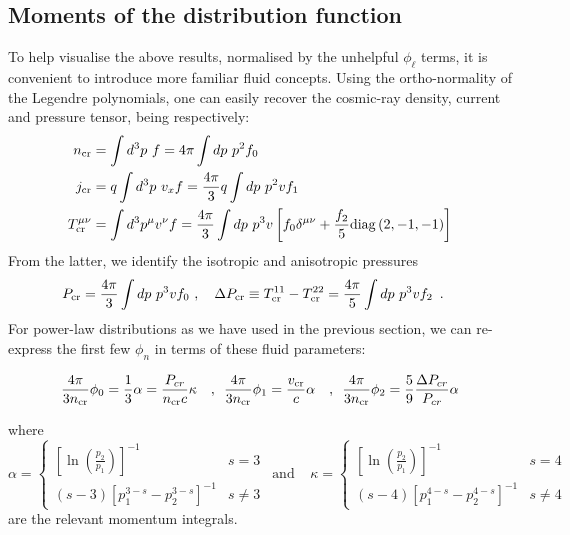 \documentclass[a4paper,fleqn,usenatbib]{mnras}
\begin{document}
\subsection{Moments of the distribution function}

To help visualise the above results, normalised by the unhelpful $\phi_\ell$ terms, it is convenient to introduce more familiar fluid concepts. Using the ortho-normality of the Legendre polynomials, one can easily recover the cosmic-ray density, current and pressure tensor, being respectively:
\begin{align*}
n_{\rm cr} &= \int d^3p~ f =  4 \pi\int dp~p^2 f_0 \\
j_{\rm cr} &= q\int d^3p~ v_x f  = \frac{4\pi}{3} q\int dp~p^2 v f_1 \\
T^{\mu\nu}_{\rm cr} &= \int d^3p^\mu v^{\nu} f =   \frac{4\pi}{3} \int dp~p^3 v \left[f_0\delta^{\mu\nu} 
+ \frac{f_2}{5}{\rm diag}\left(2 ,-1,-1 \right)\right]  
\end{align*}
From the latter, we identify the isotropic and anisotropic pressures
\begin{align*}
&P_{\rm cr} =   \frac{4\pi}{3} \int dp~p^3 v f_0 ~, \enspace \enspace
\Delta P_{\rm cr}\equiv T_{\rm cr}^{11}-T_{\rm cr}^{22} =   \frac{4\pi}{5} \int dp~p^3 v f_2 \enspace .
\end{align*}
For power-law distributions as we have used in the previous section, we can re-express the first few $\phi_n$ in terms of these fluid parameters:

 \begin{equation*}
  \frac{4 \pi}{3n_{\rm cr}}\phi_0 = \frac{1}{3} \alpha = \frac{ P_{cr}}{n_{\rm cr}c}\kappa\enspace \enspace,\enspace
 \frac{4 \pi}{3n_{\rm cr}} \phi_1  = \frac{v_{\rm cr}}{c}\alpha\enspace\enspace,\enspace
  \frac{4 \pi}{3n_{\rm cr}} \phi_2  = \frac{5}{9}\frac{\Delta P_{cr}}{P_{cr}}\alpha
 \end{equation*}

 where 
  \begin{equation*}
 \alpha=\left\lbrace 
 \begin{array}{cc}
 \left[ \ln\left(\frac{p_2}{p_1}\right)\right]^{-1}  & s=3 \\  (s-3)\left[p_1^{3-s} - p_2^{3-s}\right]^{-1} & s\neq3
 \end{array}\right. ~~\mbox{and}~~~~~
  \kappa=\left\lbrace 
 \begin{array}{cc}
 \left[ \ln\left(\frac{p_2}{p_1}\right)\right]^{-1}  & s=4 \\  (s-4)\left[p_1^{4-s} - p_2^{4-s}\right] ^{-1}& s\neq4
 \end{array}\right.
 \end{equation*}
are the relevant momentum integrals.
\end{document}

